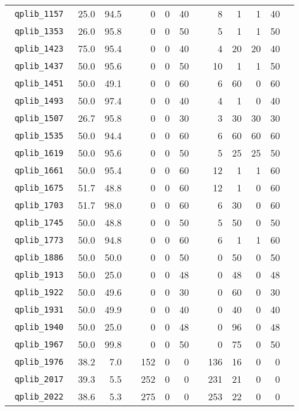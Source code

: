 {\begin{longtable}{lrrrrrrrrrrrr}
\texttt{ 	qplib\_1157	}	&	25.0	&	94.5	&	&	0	&	0	&	40	&	&	8	&	1	&	1	&	40	\\
\texttt{ 	qplib\_1353	}	&	26.0	&	95.8	&	&	0	&	0	&	50	&	&	5	&	1	&	1	&	50	\\
\texttt{ 	qplib\_1423	}	&	75.0	&	95.4	&	&	0	&	0	&	40	&	&	4	&	20	&	20	&	40	\\
\texttt{ 	qplib\_1437	}	&	50.0	&	95.6	&	&	0	&	0	&	50	&	&	10	&	1	&	1	&	50	\\
\texttt{ 	qplib\_1451	}	&	50.0	&	49.1	&	&	0	&	0	&	60	&	&	6	&	60	&	0	&	60	\\
\texttt{ 	qplib\_1493	}	&	50.0	&	97.4	&	&	0	&	0	&	40	&	&	4	&	1	&	0	&	40	\\
\texttt{ 	qplib\_1507	}	&	26.7	&	95.8	&	&	0	&	0	&	30	&	&	3	&	30	&	30	&	30	\\
\texttt{ 	qplib\_1535	}	&	50.0	&	94.4	&	&	0	&	0	&	60	&	&	6	&	60	&	60	&	60	\\
\texttt{ 	qplib\_1619	}	&	50.0	&	95.6	&	&	0	&	0	&	50	&	&	5	&	25	&	25	&	50	\\
\texttt{ 	qplib\_1661	}	&	50.0	&	95.4	&	&	0	&	0	&	60	&	&	12	&	1	&	1	&	60	\\
\texttt{ 	qplib\_1675	}	&	51.7	&	48.8	&	&	0	&	0	&	60	&	&	12	&	1	&	0	&	60	\\
\texttt{ 	qplib\_1703	}	&	51.7	&	98.0	&	&	0	&	0	&	60	&	&	6	&	30	&	0	&	60	\\
\texttt{ 	qplib\_1745	}	&	50.0	&	48.8	&	&	0	&	0	&	50	&	&	5	&	50	&	0	&	50	\\
\texttt{ 	qplib\_1773	}	&	50.0	&	94.8	&	&	0	&	0	&	60	&	&	6	&	1	&	1	&	60	\\
\texttt{ 	qplib\_1886	}	&	50.0	&	50.0	&	&	0	&	0	&	50	&	&	0	&	50	&	0	&	50	\\
\texttt{ 	qplib\_1913	}	&	50.0	&	25.0	&	&	0	&	0	&	48	&	&	0	&	48	&	0	&	48	\\
\texttt{ 	qplib\_1922	}	&	50.0	&	49.6	&	&	0	&	0	&	30	&	&	0	&	60	&	0	&	30	\\
\texttt{ 	qplib\_1931	}	&	50.0	&	49.9	&	&	0	&	0	&	40	&	&	0	&	40	&	0	&	40	\\
\texttt{ 	qplib\_1940	}	&	50.0	&	25.0	&	&	0	&	0	&	48	&	&	0	&	96	&	0	&	48	\\
\texttt{ 	qplib\_1967	}	&	50.0	&	99.8	&	&	0	&	0	&	50	&	&	0	&	75	&	0	&	50	\\
\texttt{ 	qplib\_1976	}	&	38.2	&	7.0	&	&	152	&	0	&	0	&	&	136	&	16	&	0	&	0	\\
\texttt{ 	qplib\_2017	}	&	39.3	&	5.5	&	&	252	&	0	&	0	&	&	231	&	21	&	0	&	0	\\
\texttt{ 	qplib\_2022	}	&	38.6	&	5.3	&	&	275	&	0	&	0	&	&	253	&	22	&	0	&	0	\\

\end{longtable}}
